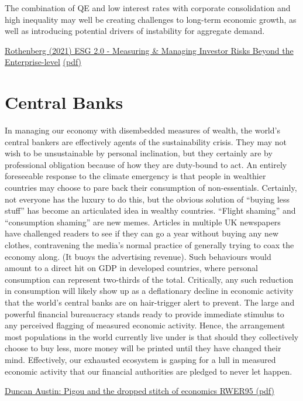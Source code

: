 \documentclass[
]{book}
\begin{document}
The combination of QE and low interest rates with corporate consolidation and high
inequality may well be creating challenges to long-term economic growth,
as well as introducing
potential drivers of instability for aggregate demand.

\href{https://papers.ssrn.com/sol3/papers.cfm?abstract_id=3820316}{Rothenberg (2021) ESG 2.0 - Measuring \& Managing Investor Risks Beyond the Enterprise-level}
\href{Rothenberg_2021_ESG2.pdf}{(pdf)}

\hypertarget{central-banks}{%
\section{Central Banks}\label{central-banks}}

In managing our economy with disembedded measures of wealth,
the world's central bankers are effectively agents of the sustainability crisis. They may not
wish to be unsustainable by personal inclination, but they certainly are by professional
obligation because of how they are duty-bound to act.
An entirely foreseeable response to the climate emergency is that people in wealthier
countries may choose to pare back their consumption of non-essentials. Certainly, not
everyone has the luxury to do this, but the obvious solution of ``buying less stuff'' has become
an articulated idea in wealthy countries. ``Flight shaming'' and ``consumption shaming'' are new
memes. Articles in multiple UK newspapers have challenged readers to see if they can go a
year without buying any new clothes, contravening the media's normal practice of generally
trying to coax the economy along. (It buoys the advertising revenue).
Such behaviours would amount to a direct hit on GDP in developed countries, where personal
consumption can represent two-thirds of the total. Critically, any such reduction in
consumption will likely show up as a deflationary decline in economic activity that the world's
central banks are on hair-trigger alert to prevent. The large and powerful financial
bureaucracy stands ready to provide immediate stimulus to any perceived flagging of
measured economic activity.
Hence, the arrangement most populations in the world currently live under is that should they
collectively choose to buy less, more money will be printed until they have changed their
mind. Effectively, our exhausted ecosystem is gasping for a lull in measured economic activity
that our financial authorities are pledged to never let happen.

\href{pdf/Austin_2021_Pigou_\%20and_the_dropped_stitch_of_economics_RWER95.pdf}{Duncan Austin: Pigou and the dropped stitch of economics RWER95 (pdf)}
\end{document}
